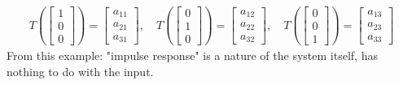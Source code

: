         \begin{equation}
            \begin{aligned}
                T(\begin{bmatrix}
                            1\\
                            0\\
                            0
                    \end{bmatrix}) = \begin{bmatrix}
                        a_{11}\\
                        a_{21}\\
                        a_{31}
                    \end{bmatrix},\quad
                T(\begin{bmatrix}
                            0\\
                            1\\
                            0
                    \end{bmatrix}) =\begin{bmatrix}
                        a_{12}\\
                        a_{22}\\
                        a_{32}
                    \end{bmatrix},\quad
                T(\begin{bmatrix}
                            0\\
                            0\\
                            1
                    \end{bmatrix})=\begin{bmatrix}
                        a_{13}\\
                        a_{23}\\
                        a_{33}
                    \end{bmatrix}
            \end{aligned}
        \end{equation}
    From this example: "impulse response" is a nature of the system itself, has nothing to do with the input.







